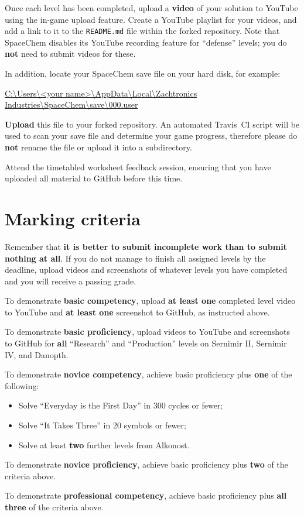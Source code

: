 \documentclass{../../../fal_assignment}
\begin{document}
Once each level has been completed, upload a \textbf{video} of your solution to YouTube using the in-game upload feature.
Create a YouTube playlist for your videos, and add a link to it to the \texttt{README.md} file within the forked repository.
Note that SpaceChem disables its YouTube recording feature for ``defense'' levels; you do \textbf{not} need to submit videos for these.

In addition, locate your SpaceChem save file on your hard disk, for example:

\url{C:\Users\<your name>\AppData\Local\Zachtronics Industries\SpaceChem\save\000.user}

\textbf{Upload} this file to your forked repository.
An automated Travis~CI script will be used to scan your save file and determine your game progress,
therefore please do \textbf{not} rename the file or upload it into a subdirectory.

Attend the timetabled worksheet feedback session,
ensuring that you have uploaded all material to GitHub before this time.

\section*{Marking criteria}

Remember that \textbf{it is better to submit incomplete work than to submit nothing at all}. If you do not manage to finish all assigned levels by the deadline, upload videos and screenshots of whatever levels you have completed and you will receive a passing grade.

To demonstrate \textbf{basic competency}, upload \textbf{at least one} completed level video to YouTube and \textbf{at least one} screenshot to GitHub, as instructed above.

To demonstrate \textbf{basic proficiency}, upload videos to YouTube and screenshots to GitHub for \textbf{all} ``Research'' and ``Production'' levels on Sernimir II, Sernimir IV, and Danopth.

To demonstrate \textbf{novice competency}, achieve basic proficiency plus \textbf{one} of the following:
	\begin{itemize}
		\item Solve ``Everyday is the First Day'' in 300 cycles or fewer;
		\item Solve ``It Takes Three'' in 20 symbols or fewer;
		\item Solve at least \textbf{two} further levels from Alkonost.
	\end{itemize}

To demonstrate \textbf{novice proficiency}, achieve basic proficiency plus \textbf{two} of the criteria above.

To demonstrate \textbf{professional competency}, achieve basic proficiency plus \textbf{all three} of the criteria above.
\end{document}
